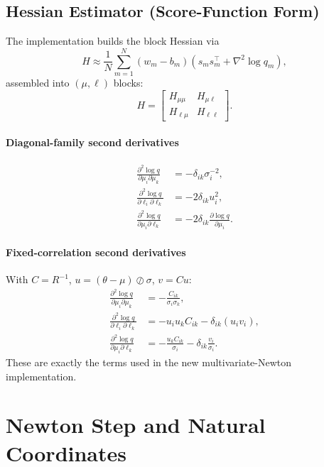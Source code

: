 \documentclass[11pt]{article}
\begin{document}
\subsection{Hessian Estimator (Score-Function Form)}
The implementation builds the block Hessian via
\begin{equation}
H \approx \frac1N\sum_{m=1}^{N}
(w_m-b_m)\left(s_m s_m^\top + \nabla^2 \log q_m\right),
\end{equation}
assembled into \((\mu,\ell)\) blocks:
\[
H=
\begin{bmatrix}
H_{\mu\mu} & H_{\mu\ell}\\
H_{\ell\mu} & H_{\ell\ell}
\end{bmatrix}.
\]

\paragraph{Diagonal-family second derivatives}
\begin{align}
\frac{\partial^2 \log q}{\partial \mu_i\partial\mu_k}
&= -\delta_{ik}\sigma_i^{-2},\\
\frac{\partial^2 \log q}{\partial \ell_i\partial\ell_k}
&= -2\delta_{ik}u_i^2,\\
\frac{\partial^2 \log q}{\partial \mu_i\partial\ell_k}
&= -2\delta_{ik}\frac{\partial \log q}{\partial\mu_i}.
\end{align}

\paragraph{Fixed-correlation second derivatives}
With \(C=R^{-1}\), \(u=(\theta-\mu)\oslash \sigma\), \(v=Cu\):
\begin{align}
\frac{\partial^2 \log q}{\partial \mu_i\partial\mu_k}
&= -\frac{C_{ik}}{\sigma_i\sigma_k},\\
\frac{\partial^2 \log q}{\partial \ell_i\partial\ell_k}
&= -u_i u_k C_{ik} - \delta_{ik}(u_i v_i),\\
\frac{\partial^2 \log q}{\partial \mu_i\partial\ell_k}
&= -\frac{u_k C_{ik}}{\sigma_i} - \delta_{ik}\frac{v_i}{\sigma_i}.
\end{align}
These are exactly the terms used in the new multivariate-Newton implementation.

\section{Newton Step and Natural Coordinates}
\end{document}
